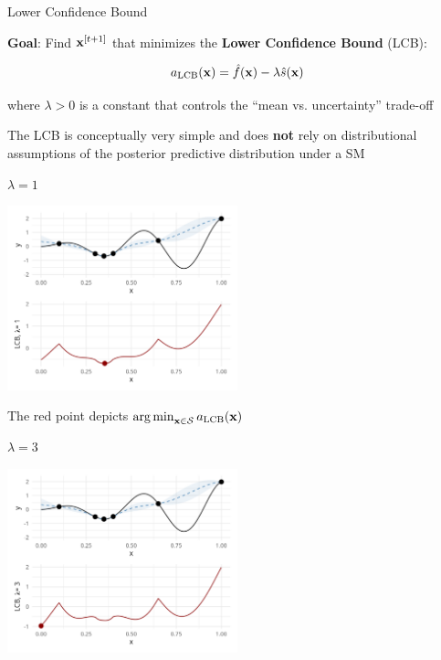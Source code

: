 \documentclass[11pt,compress,t,notes=noshow, xcolor=table]{beamer}
\begin{document}
\begin{vbframe}{Lower Confidence Bound}

\textbf{Goal}: Find $\mathbf{x}^{[t+1]}$ that minimizes the \textbf{Lower Confidence Bound} (LCB):

$$
  a_{\text{LCB}}(\mathbf{x}) = \hat{f}(\mathbf{x}) - \lambda \hat{s}(\mathbf{x})
$$

where $\lambda > 0$ is a constant that controls the \enquote{mean vs. uncertainty} trade-off\\

\vspace{1em}

The LCB is conceptually very simple and does \textbf{not} rely on distributional assumptions of the posterior predictive distribution under a SM

\framebreak

$\lambda = 1$

\begin{center}
  \includegraphics[width = 0.5\textwidth]{figure_man/bayesian_loop_lcb_0.png}
\end{center}

The red point depicts $\operatorname{arg\,min}_{\mathbf{x} \in \mathcal{S}} a_{\text{LCB}}(\mathbf{x})$

\framebreak

$\lambda = 3$

\begin{center}
  \includegraphics[width = 0.5\textwidth]{figure_man/bayesian_loop_lcb_1.png}
\end{center}


\end{vbframe}
\end{document}
